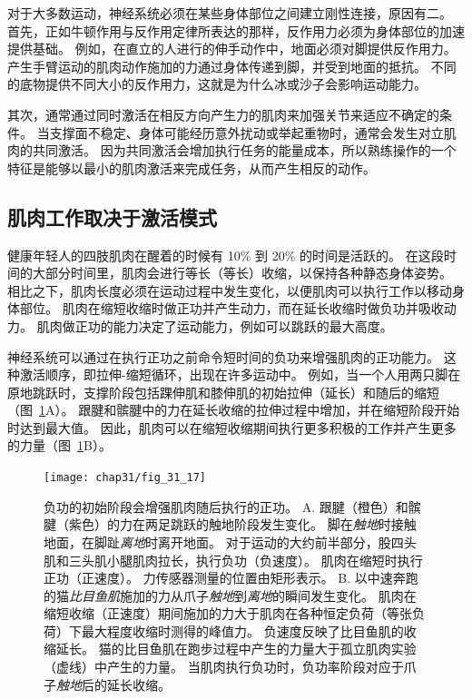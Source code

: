 对于大多数运动，神经系统必须在某些身体部位之间建立刚性连接，原因有二。
首先，正如牛顿作用与反作用定律所表达的那样，反作用力必须为身体部位的加速提供基础。
例如，在直立的人进行的伸手动作中，地面必须对脚提供反作用力。
产生手臂运动的肌肉动作施加的力通过身体传递到脚，并受到地面的抵抗。
不同的底物提供不同大小的反作用力，这就是为什么冰或沙子会影响运动能力。


其次，通常通过同时激活在相反方向产生力的肌肉来加强关节来适应不确定的条件。
当支撑面不稳定、身体可能经历意外扰动或举起重物时，通常会发生对立肌肉的共同激活。
因为共同激活会增加执行任务的能量成本，所以熟练操作的一个特征是能够以最小的肌肉激活来完成任务，从而产生相反的动作。



\subsection{肌肉工作取决于激活模式}

健康年轻人的四肢肌肉在醒着的时候有 10\% 到 20\% 的时间是活跃的。
在这段时间的大部分时间里，肌肉会进行等长（等长）收缩，以保持各种静态身体姿势。
相比之下，肌肉长度必须在运动过程中发生变化，以便肌肉可以执行工作以移动身体部位。
肌肉在缩短收缩时做正功并产生动力，而在延长收缩时做负功并吸收动力。
肌肉做正功的能力决定了运动能力，例如可以跳跃的最大高度。


神经系统可以通过在执行正功之前命令短时间的负功来增强肌肉的正功能力。
这种激活顺序，即拉伸-缩短循环，出现在许多运动中。 
例如，当一个人用两只脚在原地跳跃时，支撑阶段包括踝伸肌和膝伸肌的初始拉伸（延长）和随后的缩短（图~\ref{fig:31_17}A）。
跟腱和髌腱中的力在延长收缩的拉伸过程中增加，并在缩短阶段开始时达到最大值。
因此，肌肉可以在缩短收缩期间执行更多积极的工作并产生更多的力量（图~\ref{fig:31_17}B）。


\begin{figure}[htbp]
	\centering
	\texttt{[image: chap31/fig\_31\_17]}
	\caption{负功的初始阶段会增强肌肉随后执行的正功\cite{finni2000vivo,gregor1988mechanical}。
	A. 跟腱（橙色）和髌腱（紫色）的力在两足跳跃的触地阶段发生变化。
	脚在\textit{触地}时接触地面，在脚趾\textit{离地}时离开地面。
	对于运动的大约前半部分，股四头肌和三头肌小腿肌肉拉长，执行负功（负速度）。
	肌肉在缩短时执行正功（正速度）。
	力传感器测量的位置由矩形表示。
	B. 以中速奔跑的猫\textit{比目鱼肌}施加的力从爪子\textit{触地}到\textit{离地}的瞬间发生变化。
	肌肉在缩短收缩（正速度）期间施加的力大于肌肉在各种恒定负荷（等张负荷）下最大程度收缩时测得的峰值力。
	负速度反映了比目鱼肌的收缩延长。
	猫的比目鱼肌在跑步过程中产生的力量大于孤立肌肉实验（虚线）中产生的力量。
	当肌肉执行负功时，负功率阶段对应于爪子\textit{触地}后的延长收缩。}
	\label{fig:31_17}
\end{figure}


